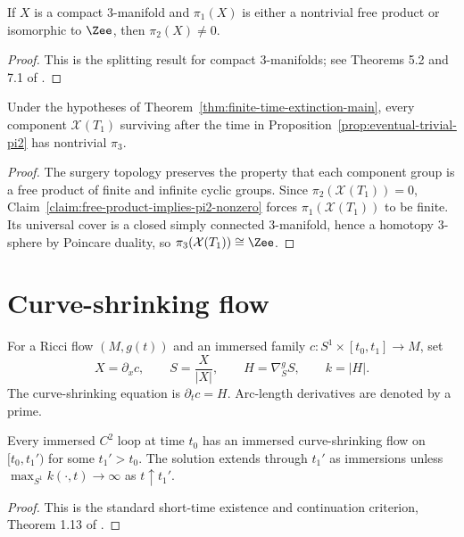 \begin{claim}
\label{claim:free-product-implies-pi2-nonzero}
If $X$ is a compact $3$-manifold and $\pi_1(X)$ is either a nontrivial free
product or isomorphic to $\Zee$, then $\pi_2(X)\ne0$.
\end{claim}
\begin{proof}
\sketch This is the splitting result for compact $3$-manifolds; see
Theorems 5.2 and 7.1 of \cite{Hempel}.
\end{proof}

\begin{claim}
\label{claim:x-t1-nontrivial-pi3}
Under the hypotheses of Theorem~\ref{thm:finite-time-extinction-main}, every
component ${\mathcal X}(T_1)$ surviving after the time in
Proposition~\ref{prop:eventual-trivial-pi2} has nontrivial $\pi_3$.
\end{claim}
\begin{proof}
\sketch The surgery topology preserves the property that each component group
is a free product of finite and infinite cyclic groups. Since
$\pi_2({\mathcal X}(T_1))=0$, Claim~\ref{claim:free-product-implies-pi2-nonzero}
forces $\pi_1({\mathcal X}(T_1))$ to be finite. Its universal cover is a closed
simply connected $3$-manifold, hence a homotopy $3$-sphere by Poincare duality,
so $\pi_3({\mathcal X}(T_1))\cong\Zee$.
\end{proof}

\section{Curve-shrinking flow}
\label{sect:csf}

For a Ricci flow $(M,g(t))$ and an immersed family
$c\colon S^1\times[t_0,t_1]\to M$, set
\[
X=\partial_xc,\qquad S=\frac X{|X|},\qquad
H=\nabla^g_SS,\qquad k=|H|.
\]
The curve-shrinking equation is $\partial_tc=H$. Arc-length derivatives are
denoted by a prime.

\begin{claim}
\label{claim:curve-shrinking-short-time-existence}
\label{curvshrexist}
Every immersed $C^2$ loop at time $t_0$ has an immersed curve-shrinking flow
on $[t_0,t_1')$ for some $t_1'>t_0$. The solution extends through $t_1'$ as
immersions unless $\max_{S^1}k(\cdot,t)\to\infty$ as $t\uparrow t_1'$.
\end{claim}
\begin{proof}
\sketch This is the standard short-time existence and continuation criterion,
Theorem 1.13 of \cite{AG}.
\end{proof}

